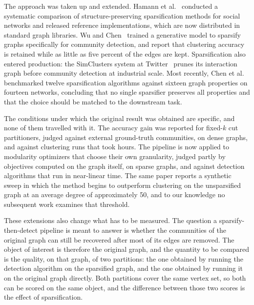 The approach was taken up and extended. Hamann et
al.~\cite{hamann2016structure} conducted a systematic comparison of
structure-preserving sparsification methods for social networks and released
reference implementations, which are now distributed in standard graph libraries.
Wu and Chen~\cite{wu2020gsgan} trained a generative model to sparsify graphs
specifically for community detection, and report that clustering accuracy is
retained while as little as five percent of the edges are kept. Sparsification
also entered production: the SimClusters system at
Twitter~\cite{satuluri2020simclusters} prunes its interaction graph before
community detection at industrial scale. Most recently, Chen et
al.~\cite{chen2024demystifying} benchmarked twelve sparsification algorithms
against sixteen graph properties on fourteen networks, concluding that no single
sparsifier preserves all properties and that the choice should be matched to the
downstream task.

The conditions under which the original result was obtained are specific, and
none of them travelled with it. The accuracy gain was reported for fixed-$k$ cut
partitioners, judged against external ground-truth communities, on dense graphs,
and against clustering runs that took hours. The pipeline is now applied to
modularity optimizers that choose their own granularity, judged partly by
objectives computed on the graph itself, on sparse graphs, and against detection
algorithms that run in near-linear time. The same paper reports a synthetic sweep
in which the method begins to outperform clustering on the unsparsified graph at
an average degree of approximately 50, and to our knowledge no subsequent work
examines that threshold.

These extensions also change what has to be measured. The question a
sparsify-then-detect pipeline is meant to answer is whether the communities of
the original graph can still be recovered after most of its edges are removed.
The object of interest is therefore the original graph, and the quantity to be
compared is the quality, on that graph, of two partitions: the one obtained by
running the detection algorithm on the sparsified graph, and the one obtained by
running it on the original graph directly. Both partitions cover the same vertex
set, so both can be scored on the same object, and the difference between those
two scores is the effect of sparsification.

